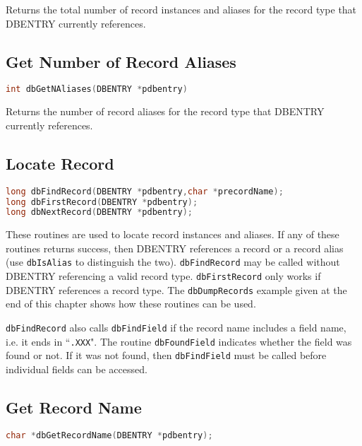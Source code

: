 Returns the total number of record instances and aliases for the record type that DBENTRY currently references.

\subsection{Get Number of Record Aliases}

\begin{lstlisting}[language=C]
int dbGetNAliases(DBENTRY *pdbentry)
\end{lstlisting}

Returns the number of record aliases for the record type that DBENTRY currently references.

\subsection{Locate Record}

\begin{lstlisting}[language=C]
long dbFindRecord(DBENTRY *pdbentry,char *precordName);
long dbFirstRecord(DBENTRY *pdbentry);
long dbNextRecord(DBENTRY *pdbentry);
\end{lstlisting}

These routines are used to locate record instances and aliases.
If any of these routines returns success, then DBENTRY references a record or a record alias (use \verb|dbIsAlias| to distinguish the two).
\verb|dbFindRecord| may be called without DBENTRY referencing a valid record type.
\verb|dbFirstRecord| only works if DBENTRY references a record type.
The \verb|dbDumpRecords| example given at the end of this chapter shows how these routines can be used.

\verb|dbFindRecord| also calls \verb|dbFindField| if the record name includes a field name, i.e. it ends in ``\verb|.XXX|".
The routine \verb|dbFoundField| indicates whether the field was found or not.
If it was not found, then \verb|dbFindField| must be called before individual fields can be accessed.

\subsection{Get Record Name}

\begin{lstlisting}[language=C]
char *dbGetRecordName(DBENTRY *pdbentry);
\end{lstlisting}

